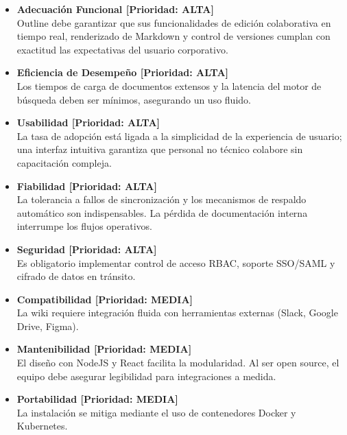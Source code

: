 \documentclass[12pt]{article}
\begin{document}
\begin{itemize}
    \item \textbf{Adecuación Funcional [Prioridad: ALTA]} \\
    Outline debe garantizar que sus funcionalidades de edición colaborativa en tiempo real, renderizado de Markdown y control de versiones cumplan con exactitud las expectativas del usuario corporativo.
    
    \item \textbf{Eficiencia de Desempeño [Prioridad: ALTA]} \\
    Los tiempos de carga de documentos extensos y la latencia del motor de búsqueda deben ser mínimos, asegurando un uso fluido.
    
    \item \textbf{Usabilidad [Prioridad: ALTA]} \\
    La tasa de adopción está ligada a la simplicidad de la experiencia de usuario; una interfaz intuitiva garantiza que personal no técnico colabore sin capacitación compleja.
    
    \item \textbf{Fiabilidad [Prioridad: ALTA]} \\
    La tolerancia a fallos de sincronización y los mecanismos de respaldo automático son indispensables. La pérdida de documentación interna interrumpe los flujos operativos.
    
    \item \textbf{Seguridad [Prioridad: ALTA]} \\
    Es obligatorio implementar control de acceso RBAC, soporte SSO/SAML y cifrado de datos en tránsito.
    
    \item \textbf{Compatibilidad [Prioridad: MEDIA]} \\
    La wiki requiere integración fluida con herramientas externas (Slack, Google Drive, Figma).
    
    \item \textbf{Mantenibilidad [Prioridad: MEDIA]} \\
    El diseño con NodeJS y React facilita la modularidad. Al ser open source, el equipo debe asegurar legibilidad para integraciones a medida.
    
    \item \textbf{Portabilidad [Prioridad: MEDIA]} \\
    La instalación se mitiga mediante el uso de contenedores Docker y Kubernetes.
\end{itemize}
\end{document}
